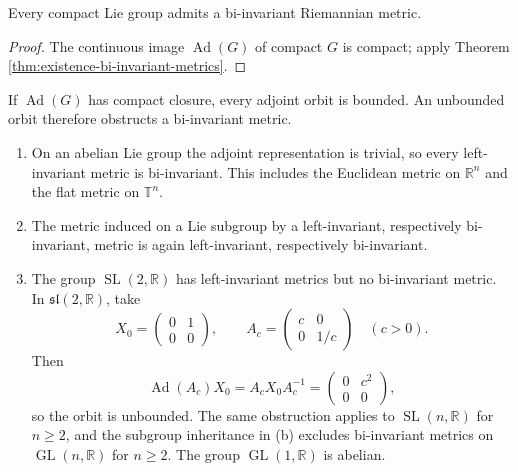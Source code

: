 \begin{corollary}
\label{cor:compact-lie-group-bi-invariant-metric}
Every compact Lie group admits a bi-invariant Riemannian metric.
\end{corollary}
\begin{proof}
\sketch The continuous image $\operatorname{Ad}(G)$ of compact $G$ is compact;
apply Theorem \ref{thm:existence-bi-invariant-metrics}.
\end{proof}

If $\operatorname{Ad}(G)$ has compact closure, every adjoint orbit is bounded.
An unbounded orbit therefore obstructs a bi-invariant metric.

\begin{example}
\label{ex:invariant-metrics-lie-groups}
\begin{enumerate}[label=(\alph*)]
\item On an abelian Lie group the adjoint representation is trivial, so every
left-invariant metric is bi-invariant. This includes the Euclidean metric on
$\mathbb R^n$ and the flat metric on $\mathbb T^n$.

\item The metric induced on a Lie subgroup by a left-invariant, respectively
bi-invariant, metric is again left-invariant, respectively bi-invariant.

\item The group $\operatorname{SL}(2,\mathbb R)$ has left-invariant metrics but
no bi-invariant metric. In
$\mathfrak{sl}(2,\mathbb R)$, take
\[
X_0=\begin{pmatrix}0&1\\0&0\end{pmatrix},\qquad
A_c=\begin{pmatrix}c&0\\0&1/c\end{pmatrix}\quad(c>0).
\]
Then
\[
\operatorname{Ad}(A_c)X_0=A_cX_0A_c^{-1}
=\begin{pmatrix}0&c^2\\0&0\end{pmatrix},
\]
so the orbit is unbounded. The same obstruction applies to
$\operatorname{SL}(n,\mathbb R)$ for $n\ge2$, and the subgroup inheritance in
(b) excludes bi-invariant metrics on $\operatorname{GL}(n,\mathbb R)$ for
$n\ge2$. The group $\operatorname{GL}(1,\mathbb R)$ is abelian.


\end{enumerate}
\end{example}
